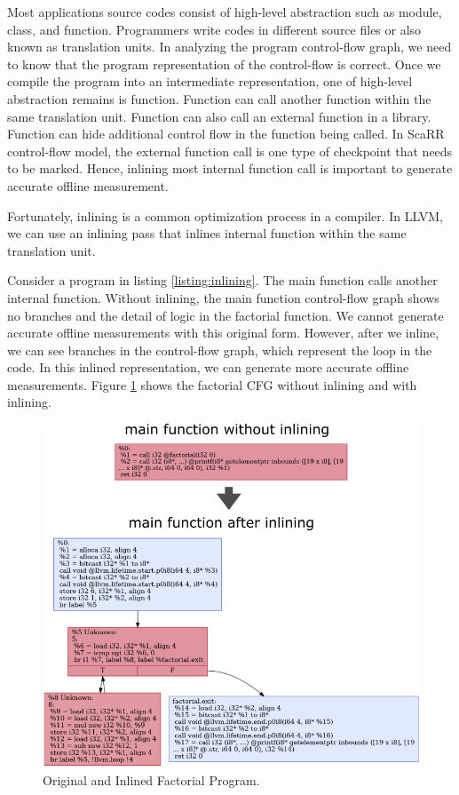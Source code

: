 Most applications source codes consist of high-level abstraction such as module,
class, and function. Programmers write codes in different source files or also
known as translation units. In analyzing the program control-flow graph, we need
to know that the program representation of the control-flow is correct. Once we
compile the program into an intermediate representation, one of high-level
abstraction remains is function. Function can call another function within the
same translation unit. Function can also call an external function in a library.
Function can hide additional control flow in the function being called. In ScaRR
control-flow model, the external function call is one type of checkpoint that
needs to be marked. Hence, inlining most internal function call is important to
generate accurate offline measurement. 

Fortunately, inlining is a common optimization process in a compiler. In LLVM,
we can use an inlining pass that inlines internal function within the same
translation unit.

Consider a program in listing \ref{listing:inlining}. The main function calls
another internal function. Without inlining, the main function control-flow
graph shows no branches and the detail of logic in the factorial function. We
cannot generate accurate offline measurements with this original form. However,
after we inline, we can see branches in the control-flow graph, which represent
the loop in the code. In this inlined representation, we can generate more
accurate offline measurements. Figure \ref{fig:inlining} shows the factorial CFG
without inlining and with inlining.


\begin{figure}[h]
    \centerline{\includegraphics[scale=.80]{Figures/04/inlining-function.png}}
    \caption{Original and Inlined Factorial Program.}
    \label{fig:inlining}
\end{figure}

